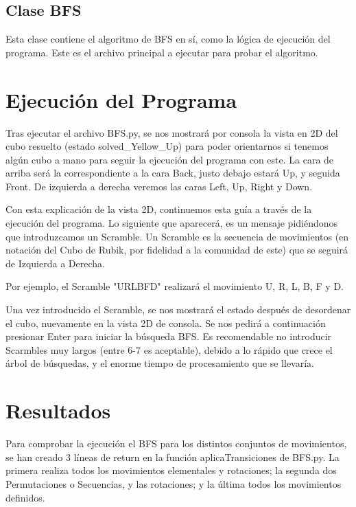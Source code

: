 \documentclass[11pt]{article}
\begin{document}
\subsection{Clase BFS}

Esta clase contiene el algoritmo de BFS en sí, como la lógica de ejecución del programa. Este es el archivo principal a ejecutar para probar el algoritmo.

\section{Ejecución del Programa}

Tras ejecutar el archivo BFS.py, se nos mostrará por consola la vista en 2D del cubo resuelto (estado solved\_Yellow\_Up) para poder orientarnos si tenemos algún cubo a mano para seguir la ejecución del programa con este. La cara de arriba será la correspondiente a la cara Back, justo debajo estará Up, y seguida Front. De izquierda a derecha veremos las caras Left, Up, Right y Down.
\newline

Con esta explicación de la vista 2D, continuemos esta guía a través de la ejecución del programa. Lo siguiente que aparecerá, es un mensaje pidiéndonos que introduzcamos un Scramble.
Un Scramble es la secuencia de movimientos (en notación del Cubo de Rubik, por fidelidad a la comunidad de este) que se seguirá de Izquierda a Derecha. 
\newline

Por ejemplo, el Scramble "URLBFD" realizará el movimiento U, R, L, B, F y D.
\newline

Una vez introducido el Scramble, se nos mostrará el estado después de desordenar el cubo, nuevamente en la vista 2D de consola. Se nos pedirá a continuación presionar Enter para iniciar la búsqueda BFS. Es recomendable no introducir Scarmbles muy largos (entre 6-7 es aceptable), debido a lo rápido que crece el árbol de búsquedas, y el enorme tiempo de procesamiento que se llevaría.

\section{Resultados}
	Para comprobar la ejecución el BFS para los distintos conjuntos de movimientos, se han creado 3 líneas de return en la función aplicaTransiciones de BFS.py. La primera realiza todos los movimientos elementales y rotaciones; la segunda dos Permutaciones o Secuencias, y las rotaciones; y la última todos los movimientos definidos.
\newline
\end{document}
